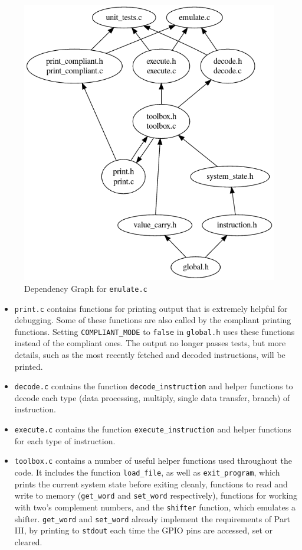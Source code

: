 \documentclass[10pt]{article}
\begin{document}
\begin{figure}[H]
\begin{minipage}{0.35\linewidth}
\centering
\includegraphics[scale=0.3]{checkpoint/emulate.png}
\caption{Dependency Graph for \texttt{emulate.c}}

\end{minipage}
\end{figure}

\begin{itemize}
\item \texttt{print.c} contains functions for printing output that is extremely helpful for debugging. Some of these functions are also called by the compliant printing functions. Setting \texttt{COMPLIANT\_MODE} to \texttt{false} in \texttt{global.h} uses these functions instead of the compliant ones. The output no longer passes tests, but more details, such as the most recently fetched and decoded instructions, will be printed.
\item \texttt{decode.c} contains the function \texttt{decode\_instruction} and helper functions to decode each type (data processing, multiply, single data transfer, branch) of instruction.
\item \texttt{execute.c} contains the function \texttt{execute\_instruction} and helper functions for each type of instruction.
\item \texttt{toolbox.c} contains a number of useful helper functions used throughout the code. It includes the function \texttt{load\_file}, as well as \texttt{exit\_program}, which prints the current system state before exiting cleanly, functions to read and write to memory (\texttt{get\_word} and \texttt{set\_word} respectively), functions for working with two's complement numbers, and the \texttt{shifter} function, which emulates a shifter. \texttt{get\_word} and \texttt{set\_word} already implement the requirements of Part III, by printing to \texttt{stdout} each time the GPIO pins are accessed, set or cleared.
\end{itemize}
\end{document}

